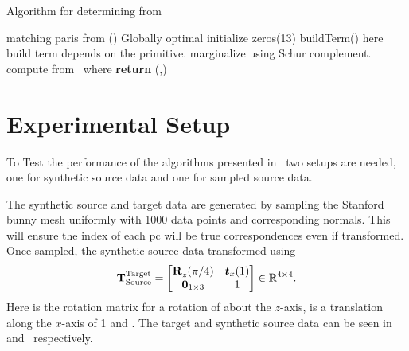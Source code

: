 \begin{algorithm}
	\algrenewcommand{}
	\algrenewcommand{}
	\caption{Algorithm for determining \tf[T]{\star}{} from }
	\label{alg:t-star}
	\begin{algorithmic}[1]
		\Require matching paris from ()
		\Ensure Globally optimal \tf[T]{\star}{}
		\State initialize  zeros(\num{13})
			\State {} buildTerm() here build term depends on the primitive.
			\State {}
		\EndFor
		\State marginalize  using Schur complement.
		\State compute \tf[R]{\star}{} from~
		\State {} where 
		\State \textbf{return} \tf[T]{\star}{}(\tf[R]{\star}{},)
	\end{algorithmic}
\end{algorithm}

\section{Experimental Setup}\label{sec:2-pose-estimation-experimental-setup}

To Test the performance of the algorithms presented in~ two setups are needed, one for synthetic source data and one for sampled source data. \medskip

The synthetic source and target data are generated by sampling the Stanford bunny mesh uniformly with \num{1000} data points and corresponding normals. This will ensure the index  of each \gls{pc} will be true correspondences even if transformed. Once sampled, the synthetic source data transformed using
%
\begin{equation}
	\tf[T]{\text{Target}}{\text{Source}} = 
	\begin{bmatrix}
		\tf[R]{}{z}(\pi/4) & \vec{t}_x(1) \\
		\vec{0}_{1\times 3} & 1
	\end{bmatrix}\inR{4\times 4}.
\end{equation} 
Here  is the rotation matrix for a rotation of  about the $z$-axis,  is a translation along the $x$-axis of \num{1} and . The target and synthetic source data can be seen in  and~ respectively. \medskip

